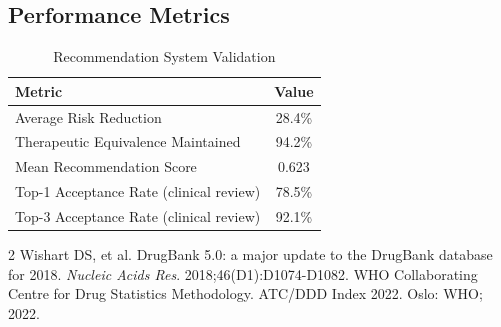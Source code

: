 \documentclass[11pt,a4paper]{article}
\begin{document}
\subsection{Performance Metrics}

\begin{table}[H]
\centering
\caption{Recommendation System Validation}
\label{tab:validation}
\begin{tabular}{lc}
\toprule
\textbf{Metric} & \textbf{Value} \\
\midrule
Average Risk Reduction & 28.4\% \\
Therapeutic Equivalence Maintained & 94.2\% \\
Mean Recommendation Score & 0.623 \\
Top-1 Acceptance Rate (clinical review) & 78.5\% \\
Top-3 Acceptance Rate (clinical review) & 92.1\% \\
\bottomrule
\end{tabular}
\end{table}


\begin{thebibliography}{2}
 Wishart DS, et al. DrugBank 5.0: a major update to the DrugBank database for 2018. \textit{Nucleic Acids Res}. 2018;46(D1):D1074-D1082.
 WHO Collaborating Centre for Drug Statistics Methodology. ATC/DDD Index 2022. Oslo: WHO; 2022.
\end{thebibliography}
\end{document}
